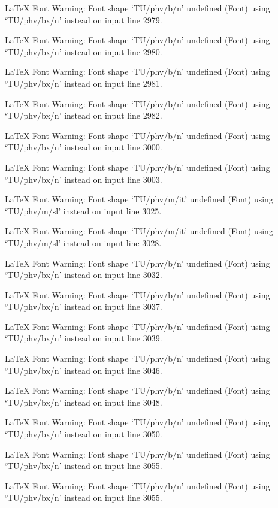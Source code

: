 LaTeX Font Warning: Font shape `TU/phv/b/n' undefined
(Font)              using `TU/phv/bx/n' instead on input line 2979.


LaTeX Font Warning: Font shape `TU/phv/b/n' undefined
(Font)              using `TU/phv/bx/n' instead on input line 2980.


LaTeX Font Warning: Font shape `TU/phv/b/n' undefined
(Font)              using `TU/phv/bx/n' instead on input line 2981.


LaTeX Font Warning: Font shape `TU/phv/b/n' undefined
(Font)              using `TU/phv/bx/n' instead on input line 2982.


LaTeX Font Warning: Font shape `TU/phv/b/n' undefined
(Font)              using `TU/phv/bx/n' instead on input line 3000.


LaTeX Font Warning: Font shape `TU/phv/b/n' undefined
(Font)              using `TU/phv/bx/n' instead on input line 3003.


LaTeX Font Warning: Font shape `TU/phv/m/it' undefined
(Font)              using `TU/phv/m/sl' instead on input line 3025.


LaTeX Font Warning: Font shape `TU/phv/m/it' undefined
(Font)              using `TU/phv/m/sl' instead on input line 3028.


LaTeX Font Warning: Font shape `TU/phv/b/n' undefined
(Font)              using `TU/phv/bx/n' instead on input line 3032.


LaTeX Font Warning: Font shape `TU/phv/b/n' undefined
(Font)              using `TU/phv/bx/n' instead on input line 3037.


LaTeX Font Warning: Font shape `TU/phv/b/n' undefined
(Font)              using `TU/phv/bx/n' instead on input line 3039.


LaTeX Font Warning: Font shape `TU/phv/b/n' undefined
(Font)              using `TU/phv/bx/n' instead on input line 3046.


LaTeX Font Warning: Font shape `TU/phv/b/n' undefined
(Font)              using `TU/phv/bx/n' instead on input line 3048.


LaTeX Font Warning: Font shape `TU/phv/b/n' undefined
(Font)              using `TU/phv/bx/n' instead on input line 3050.


LaTeX Font Warning: Font shape `TU/phv/b/n' undefined
(Font)              using `TU/phv/bx/n' instead on input line 3055.


LaTeX Font Warning: Font shape `TU/phv/b/n' undefined
(Font)              using `TU/phv/bx/n' instead on input line 3055.


